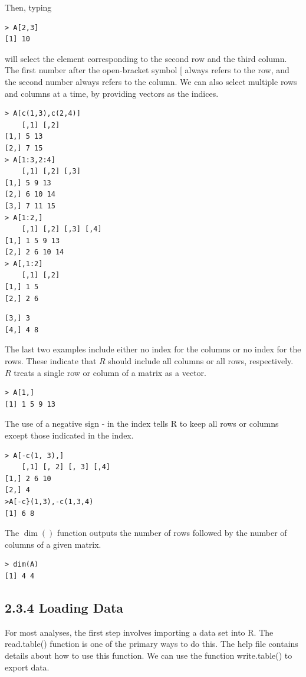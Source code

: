 \documentclass[10pt]{article}
\begin{document}
Then, typing

\begin{verbatim}
> A[2,3]
[1] 10
\end{verbatim}

will select the element corresponding to the second row and the third column. The first number after the open-bracket symbol [ always refers to the row, and the second number always refers to the column. We can also select multiple rows and columns at a time, by providing vectors as the indices.

\begin{verbatim}
> A[c(1,3),c(2,4)]
    [,1] [,2]
[1,] 5 13
[2,] 7 15
> A[1:3,2:4]
    [,1] [,2] [,3]
[1,] 5 9 13
[2,] 6 10 14
[3,] 7 11 15
> A[1:2,]
    [,1] [,2] [,3] [,4]
[1,] 1 5 9 13
[2,] 2 6 10 14
> A[,1:2]
    [,1] [,2]
[1,] 1 5
[2,] 2 6
\end{verbatim}

\begin{verbatim}
[3,] 3
[4,] 4 8
\end{verbatim}

The last two examples include either no index for the columns or no index for the rows. These indicate that $R$ should include all columns or all rows, respectively. $R$ treats a single row or column of a matrix as a vector.

\begin{verbatim}
> A[1,]
[1] 1 5 9 13
\end{verbatim}

The use of a negative sign - in the index tells R to keep all rows or columns except those indicated in the index.

\begin{verbatim}
> A[-c(1, 3),]
    [,1] [, 2] [, 3] [,4]
[1,] 2 6 10
[2,] 4
>A[-c}(1,3),-c(1,3,4)
[1] 6 8
\end{verbatim}

The $\operatorname{dim}()$ function outputs the number of rows followed by the number of columns of a given matrix.

\begin{verbatim}
> dim(A)
[1] 4 4
\end{verbatim}

\subsection*{2.3.4 Loading Data}
For most analyses, the first step involves importing a data set into R. The read.table() function is one of the primary ways to do this. The help file contains details about how to use this function. We can use the function write.table() to export data.
\end{document}
